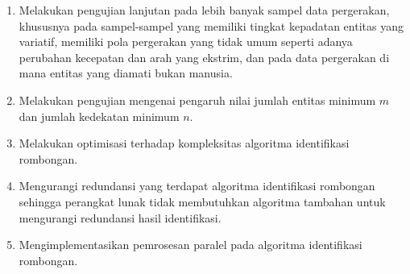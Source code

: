 \begin{enumerate}
    \item Melakukan pengujian lanjutan pada lebih banyak sampel data pergerakan, khususnya pada sampel-sampel yang memiliki tingkat kepadatan entitas yang variatif, memiliki pola pergerakan yang tidak umum seperti adanya perubahan kecepatan dan arah yang ekstrim, dan pada data pergerakan di mana entitas yang diamati bukan manusia.
    \item Melakukan pengujian mengenai pengaruh nilai jumlah entitas minimum $m$ dan jumlah kedekatan minimum $n$.
    \item Melakukan optimisasi terhadap kompleksitas algoritma identifikasi rombongan.
    \item Mengurangi redundansi yang terdapat algoritma identifikasi rombongan sehingga perangkat lunak tidak membutuhkan algoritma tambahan untuk mengurangi redundansi hasil identifikasi.
    \item Mengimplementasikan pemrosesan paralel pada algoritma identifikasi rombongan.
\end{enumerate}